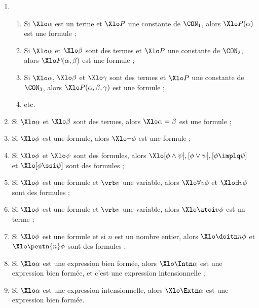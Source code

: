 \begin{defi}[Syntaxe de \LO]
\label{SynPw}
\begin{enumerate}[syn,series=RglSyn2] %
\item 
\begin{enumerate}
\item Si $\Xlo\alpha$ est un terme et $\Xlo P$ une constante de $\CON_1$, alors $\Xlo P(\alpha)$ est une formule ;
\item Si $\Xlo\alpha$ et $\Xlo\beta$ sont des termes et $\Xlo P$ une constante de $\CON_2$, alors $\Xlo P(\alpha,\beta)$ est une formule ;
\item Si $\Xlo\alpha$, $\Xlo\beta$ et $\Xlo\gamma$ sont des termes et $\Xlo P$ une constante de $\CON_3$, alors $\Xlo P(\alpha,\beta,\gamma)$ est une
formule ;
\item etc.
\end{enumerate}
\label{SynPAppw}
\item Si $\Xlo\alpha$ et $\Xlo\beta$ sont des termes, alors $\Xlo\alpha=\beta$
     est une formule ;
\label{SynP=w}
\item Si $\Xlo\phi$  est une formule, alors
 \(\Xlo\neg\phi\) est une formule ;
\label{SynPNegw}
\item Si $\Xlo\phi$ et $\Xlo\psi$  sont des formules, alors
      \(\Xlo[\phi \wedge \psi], [\phi \vee \psi], [\phi \implq
     \psi]\) et \(\Xlo[\phi \ssi \psi]\) sont des formules ;
\label{SynPConnw}
\item Si $\Xlo\phi$ est une formule  et $\vrb v$ une variable, alors $\Xlo\forall v \phi$ et
     $\Xlo\exists v \phi$ sont des formules ;%
\label{SynPQw}
\item Si $\Xlo\phi$ est une formule  et $\vrb v$ une variable, alors $\Xlo\atoi v \phi$ est un terme ;
\label{SynPiww}
\item Si $\Xlo\phi$ est une formule et si $n$ est un nombre entier, alors $\Xlo\doitn n\phi$ et $\Xlo\peutn{n}\phi$ sont des formules ;%
\label{SynModw}
\item Si $\Xlo\alpha$ est une expression bien formée, alors $\Xlo\Intn\alpha$ est une expression bien formée, et c'est une expression intensionnelle ;
\label{Syn^w}
\item Si $\Xlo\alpha$ est une expression intensionnelle, alors $\Xlo\Extn\alpha$ est une expression bien formée.
\label{Synvw}
\setcounter{RglSynt}{\value{enumi}}
\end{enumerate}
\end{defi}

